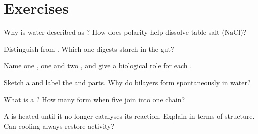 \section{Exercises}

\begin{exercise}[$\star$]\label{exo:g10:molecules-of-life:1}
Why is water described as ? How does polarity help dissolve table
salt ($\mathrm{NaCl}$)?
\end{exercise}

\begin{exercise}[$\star$]\label{exo:g10:molecules-of-life:2}
Distinguish  from . Which one digests
starch in the gut?
\end{exercise}

\begin{exercise}[$\star$]\label{exo:g10:molecules-of-life:3}
Name one , one  and two , and
give a biological role for each .
\end{exercise}

\begin{exercise}[$\star$]\label{exo:g10:molecules-of-life:4}
Sketch a  and label the  and  parts.
Why do bilayers form spontaneously in water?
\end{exercise}

\begin{exercise}[$\star$]\label{exo:g10:molecules-of-life:5}
What is a ? How many  form when five 
join into one chain?
\end{exercise}

\begin{exercise}[$\star\star$]\label{exo:g10:molecules-of-life:6}
A  is heated until it no longer catalyses its reaction. Explain in
terms of structure. Can cooling always restore activity?
\end{exercise}

